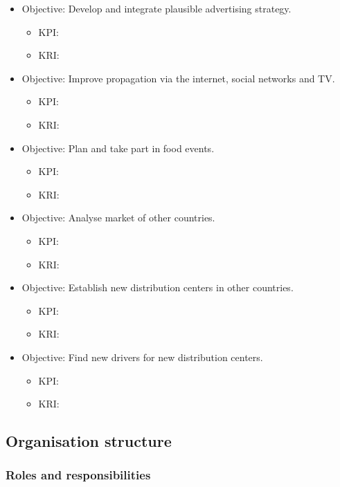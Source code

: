 \documentclass[11pt,a4paper]{article}
\begin{document}
\begin{itemize}
    \item Objective: Develop and integrate plausible advertising strategy.
    \begin{itemize}
        \item KPI: 
        \item KRI: 
    \end{itemize}
    \item Objective: Improve propagation via the internet, social networks and TV.
    \begin{itemize}
        \item KPI: 
        \item KRI: 
    \end{itemize}
    \item Objective: Plan and take part in food events.
    \begin{itemize}
        \item KPI: 
        \item KRI: 
    \end{itemize}
    \item Objective: Analyse market of other countries.
    \begin{itemize}
        \item KPI: 
        \item KRI: 
    \end{itemize}
    \item Objective: Establish new distribution centers in other countries.
    \begin{itemize}
        \item KPI: 
        \item KRI: 
    \end{itemize}
    \item Objective: Find new drivers for new distribution centers.
    \begin{itemize}
        \item KPI: 
        \item KRI: 
    \end{itemize}
\end{itemize}

\subsection{Organisation structure}
\subsubsection{Roles and responsibilities}
\end{document}
